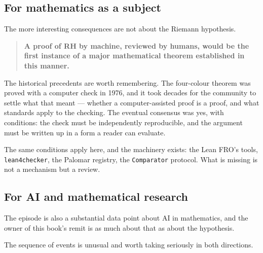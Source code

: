 \subsection{For mathematics as a subject}The more interesting consequences are not about the Riemann hypothesis.

\begin{quote}
\textbf{A proof of RH by machine, reviewed by humans, would be the first
instance of a major mathematical theorem established in this manner.}
\end{quote}

The historical precedents are worth remembering. The four-colour theorem was
proved with a computer check in 1976, and it took decades for the community
to settle what that meant --- whether a computer-assisted proof is a proof,
and what standards apply to the checking. The eventual consensus was yes, with
conditions: the check must be independently reproducible, and the argument
must be written up in a form a reader can evaluate.

The same conditions apply here, and the machinery exists: the Lean FRO's
tools, \texttt{lean4checker}, the Palomar registry, the \texttt{Comparator}
protocol. What is missing is not a mechanism but a review.

\subsection{For AI and mathematical research}The episode is also a substantial data point about AI in mathematics, and
the owner of this book's remit is as much about that as about the hypothesis.

The sequence of events is unusual and worth taking seriously in both
directions.

